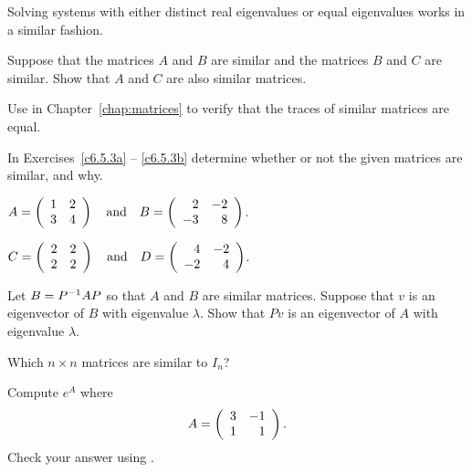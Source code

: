 \documentclass{ximera}
\begin{document}
Solving systems with either distinct real eigenvalues or equal eigenvalues
works in a similar fashion.



\EXER

\TEXER

\begin{exercise} \label{c6.5.1}
Suppose that the matrices $A$ and $B$ are similar and the matrices
$B$ and $C$ are similar.  Show that $A$ and $C$ are also similar
matrices.
\end{exercise}

\begin{exercise} \label{c6.5.2}
Use  in Chapter~\ref{chap:matrices} to verify that the
traces of similar matrices are equal.
\end{exercise}

\noindent In Exercises~\ref{c6.5.3a} -- \ref{c6.5.3b} determine whether
or not the given matrices are similar, and why.
\begin{exercise} \label{c6.5.3a}
$A = \left(\begin{array}{rr} 1 & 2\\ 3 &4\end{array}\right) \quad\mbox{and}\quad B = \left(\begin{array}{rr} 2 & -2\\ -3 &8\end{array}\right)$.
\end{exercise}
\begin{exercise} \label{c6.5.3b}
$C = \left(\begin{array}{rr} 2 & 2\\ 2 &2\end{array}\right) \quad\mbox{and}\quad D = \left(\begin{array}{rr} 4 & -2\\ -2 &4\end{array}\right)$.
\end{exercise}

\begin{exercise} \label{c6.5.4}
Let $B=P^{-1} AP$ so that $A$ and $B$ are similar matrices.  Suppose
that $v$ is an eigenvector of $B$ with eigenvalue $\lambda$.  Show
that $Pv$ is an eigenvector of $A$ with eigenvalue $\lambda$.
\end{exercise}

\begin{exercise} \label{c6.5.5}
Which $n\times n$ matrices are similar to $I_n$?
\end{exercise}

\begin{exercise} \label{c6.5.6}
Compute $e^A$ where
\[
A = \left(\begin{array}{rr} 3 & -1\\ 1 &1\end{array}\right).
\]
Check your answer using \Matlabp.
\end{exercise}
\end{document}

